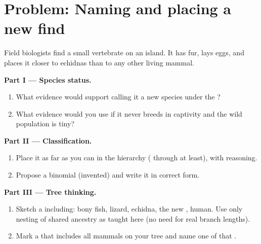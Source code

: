 \section{Problem: Naming and placing a new find}

\begin{problem}
\label{pb:g10:biodiversity-classification:1}
Field biologists find a small vertebrate on an island. It has fur, lays
eggs, and  places it closer to echidnas than to any other living mammal.

\medskip
\noindent\textbf{Part I --- Species status.}
\begin{enumerate}
  \item What evidence would support calling it a new species under the
        ?
  \item What evidence would you use if it never breeds in captivity and
        the wild population is tiny?
\end{enumerate}

\medskip
\noindent\textbf{Part II --- Classification.}
\begin{enumerate}
  \item Place it as far as you can in the hierarchy ( through
         at least), with reasoning.
  \item Propose a binomial (invented) and write it in correct form.
\end{enumerate}

\medskip
\noindent\textbf{Part III --- Tree thinking.}
\begin{enumerate}
  \item Sketch a  including: bony fish, lizard, echidna, the
        new , human. Use only nesting of shared ancestry as
        taught here (no need for real branch lengths).
  \item Mark a  that includes all mammals on your tree and name one
         of that .
\end{enumerate}
\end{problem}
